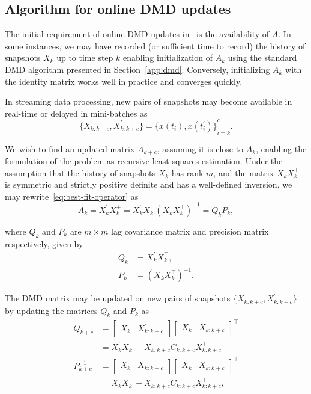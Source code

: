 \subsection{Algorithm for online DMD updates}
The initial requirement of online DMD updates in~\cite{Zhang2019} is the availability of \(A\). In some instances, we may have recorded (or sufficient time to record) the history of snapshots \(X_k\) up to time step \(k\) enabling initialization of \(A_k\) using the standard DMD algorithm presented in Section~\ref{app:dmd}. Conversely, initializing \(A_k\) with the identity matrix works well in practice and converges quickly.

In streaming data processing, new pairs of snapshots may become available in real-time or delayed in mini-batches as
\begin{equation}
    \{X_{k : k + c}, X^\prime_{k : k + c}\} = {\{x(t_i), x(t_i^\prime )\}}^c_{i=k}.
\end{equation}

We wish to find an updated matrix \(A_{k+c}\), assuming it is close to \(A_{k}\), enabling the formulation of the problem as recursive least-squares estimation. Under the assumption that the history of snapshots \(X_k\) has rank \(m\), and the matrix \(X_k X_k^\top \) is symmetric and strictly positive definite and has a well-defined inversion, we may rewrite~\eqref{eq:best-fit-operator} as
\begin{equation}\label{eq:pseudo-inverse}
    A_k = X^\prime_k X_k^+ = X^\prime_k X_k^\top {(X_k X_k^\top)}^{-1} = Q_k P_k,
\end{equation}

where \(Q_k\) and \(P_k\) are \(m \times m\) lag covariance matrix and precision matrix respectively, given by
\begin{align}\label{eq:aux-matrices}
    Q_k & = X^\prime_k X_k^\top,   \\
    P_k & = {(X_k X_k^\top)}^{-1}.
\end{align}

The DMD matrix may be updated on new pairs of snapshots \( \{X_{k: k + c}, X^\prime_{k: k + c}\} \) by updating the matrices \(Q_k\) and \(P_k\) as
\begin{align}
    Q_{k+c} & = \begin{bmatrix} X^\prime_k  & X^\prime_{k : k + c} \end{bmatrix} \begin{bmatrix} X_{k} & X_{k : k + c} \end{bmatrix}^\top  \nonumber \\
    & = X^\prime_k X_{k}^\top + X^\prime_{k : k + c} C_{k : k + c} X_{k : k + c}^\top \\
    P^{-1}_{k+c} & = \begin{bmatrix} X_{k} & X_{k : k + c} \end{bmatrix} \begin{bmatrix} X_{k} & X_{k : k + c} \end{bmatrix}^\top \nonumber \\
    & = X_{k}X_{k}^\top + X_{k : k + c} C_{k : k + c} X_{k : k + c}^\top,
\end{align}

